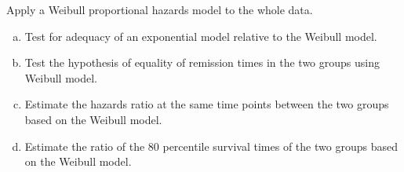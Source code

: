 \documentclass{elegantbook}
\begin{document}
\begin{exercise*}[3]
    Apply a Weibull proportional hazards model to the whole data.
    \begin{enumerate}[(a)]
        \item Test for adequacy of an exponential model relative to the Weibull model.
        \item Test the hypothesis of equality of remission times in the two groups using Weibull model.
        \item Estimate the hazards ratio at the same time points between the two groups based on the Weibull model.
        \item Estimate the ratio of the 80 percentile survival times of the two groups based on the Weibull model.
    \end{enumerate}
\end{exercise*}
\end{document}
